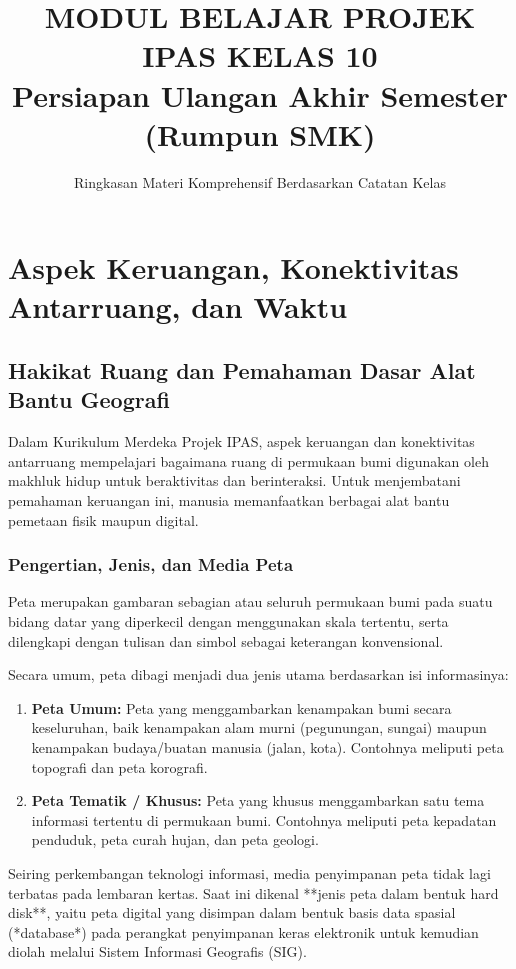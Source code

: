 \documentclass[12pt, a4paper]{article}
\title{MODUL BELAJAR PROJEK IPAS KELAS 10\\ \large Persiapan Ulangan Akhir Semester (Rumpun SMK)}
\author{Ringkasan Materi Komprehensif Berdasarkan Catatan Kelas}
\date{}
\begin{document}
\maketitle

\tableofcontents
\newpage

\section{Aspek Keruangan, Konektivitas Antarruang, dan Waktu}

\subsection{Hakikat Ruang dan Pemahaman Dasar Alat Bantu Geografi}
Dalam Kurikulum Merdeka Projek IPAS, aspek keruangan dan konektivitas antarruang mempelajari bagaimana ruang di permukaan bumi digunakan oleh makhluk hidup untuk beraktivitas dan berinteraksi. Untuk menjembatani pemahaman keruangan ini, manusia memanfaatkan berbagai alat bantu pemetaan fisik maupun digital.

\subsubsection{Pengertian, Jenis, dan Media Peta}
Peta merupakan gambaran sebagian atau seluruh permukaan bumi pada suatu bidang datar yang diperkecil dengan menggunakan skala tertentu, serta dilengkapi dengan tulisan dan simbol sebagai keterangan konvensional. 

Secara umum, peta dibagi menjadi dua jenis utama berdasarkan isi informasinya:
\begin{enumerate}
    \item \textbf{Peta Umum:} Peta yang menggambarkan kenampakan bumi secara keseluruhan, baik kenampakan alam murni (pegunungan, sungai) maupun kenampakan budaya/buatan manusia (jalan, kota). Contohnya meliputi peta topografi dan peta korografi.
    \item \textbf{Peta Tematik / Khusus:} Peta yang khusus menggambarkan satu tema informasi tertentu di permukaan bumi. Contohnya meliputi peta kepadatan penduduk, peta curah hujan, dan peta geologi.
\end{enumerate}

Seiring perkembangan teknologi informasi, media penyimpanan peta tidak lagi terbatas pada lembaran kertas. Saat ini dikenal **jenis peta dalam bentuk hard disk**, yaitu peta digital yang disimpan dalam bentuk basis data spasial (*database*) pada perangkat penyimpanan keras elektronik untuk kemudian diolah melalui Sistem Informasi Geografis (SIG).
\end{document}
